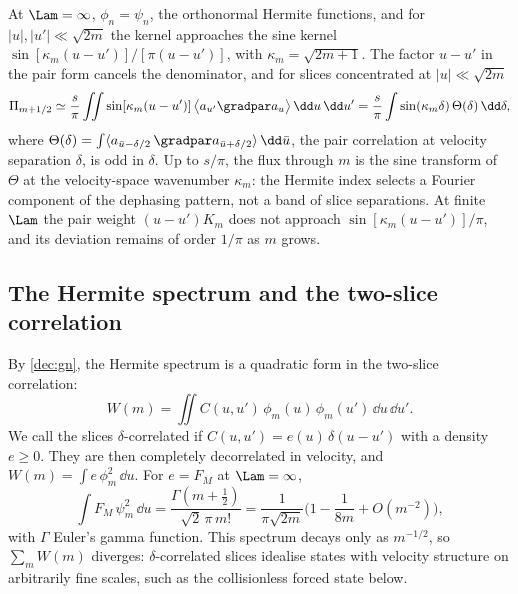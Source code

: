 At $\Lam=\infty$, $\phi_n=\psi_n$, the orthonormal Hermite functions, and for $|u|,|u'|\ll\sqrt{2m}$ the kernel approaches the sine kernel $\sin[\kappa_m(u-u')]/[\pi(u-u')]$, with $\kappa_m=\sqrt{2m+1}$. The factor $u-u'$ in the pair form cancels the denominator, and for slices concentrated at $|u|\ll\sqrt{2m}$
\begin{equation}\label{eq:fluxsine}
  \Pi_{m+1/2}\simeq\frac{s}{\pi}\iint\sin[\kappa_m(u-u')]\,\big\langle a_{u'}\gradpar a_u\big\rangle\,\dd u\,\dd u'
  =\frac{s}{\pi}\int\sin(\kappa_m\delta)\,\Theta(\delta)\,\dd\delta ,
\end{equation}
where $\Theta(\delta)=\int\langle a_{\bar u-\delta/2}\,\gradpar a_{\bar u+\delta/2}\rangle\,\dd\bar u$, the pair correlation at velocity separation $\delta$, is odd in $\delta$. Up to $s/\pi$, the flux through $m$ is the sine transform of $\Theta$ at the velocity-space wavenumber $\kappa_m$: the Hermite index selects a Fourier component of the dephasing pattern, not a band of slice separations. At finite $\Lam$ the pair weight $(u-u')K_m$ does not approach $\sin[\kappa_m(u-u')]/\pi$, and its deviation remains of order $1/\pi$ as $m$ grows.

\subsection{The Hermite spectrum and the two-slice correlation}\label{dec:sec-dictionary}

By \eqref{dec:gn}, the Hermite spectrum is a quadratic form in the two-slice correlation:
\begin{equation}\label{eq:dictionary}
  W(m)=\iint C(u,u')\,\phi_m(u)\,\phi_m(u')\,\dd u\,\dd u' .
\end{equation}
We call the slices $\delta$-correlated if $C(u,u')=e(u)\,\delta(u-u')$ with a density $e\ge0$. They are then completely decorrelated in velocity, and $W(m)=\int e\,\phi_m^2\,\dd u$. For $e=F_M$ at $\Lam=\infty$,
\begin{equation}\label{eq:prefactor}
  \int F_M\,\psi_m^2\,\dd u=\frac{\Gamma(m+\frac12)}{\sqrt2\,\pi\,m!}=\frac{1}{\pi\sqrt{2m}}\Big(1-\frac{1}{8m}+O(m^{-2})\Big),
\end{equation}
with $\Gamma$ Euler's gamma function. This spectrum decays only as $m^{-1/2}$, so $\sum_mW(m)$ diverges: $\delta$-correlated slices idealise states with velocity structure on arbitrarily fine scales, such as the collisionless forced state below.

